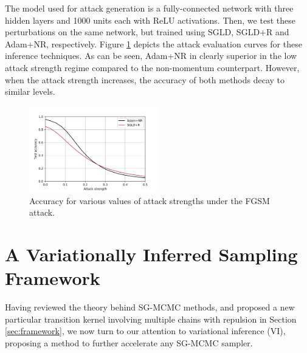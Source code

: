 The model used for attack generation is a fully-connected network with three hidden layers and 1000 units each with ReLU activations. Then, we test these perturbations on the same network, but trained using SGLD, SGLD+R and Adam+NR, respectively. Figure \ref{fig:attacks} depicts the attack evaluation curves for these inference techniques. As can be seen, Adam+NR in clearly superior in the low attack strength regime compared to the non-momentum counterpart. However, when the attack strength increases, the accuracy of both methods decay to similar levels.



\begin{figure}[h]
    \centering
\includegraphics[width=0.5\textwidth]{img/adv-2}
    \caption{Accuracy for various values of attack strengths under the FGSM attack.}\label{fig:attacks}
\end{figure}


















\section{A Variationally Inferred Sampling Framework}\label{sec:main}

Having reviewed the theory behind SG-MCMC methods, and proposed a new particular transition kernel involving multiple chains with repulsion in Section \ref{sec:framework}, we now turn to our attention to variational inference (VI), proposing a method to further accelerate any SG-MCMC sampler.

